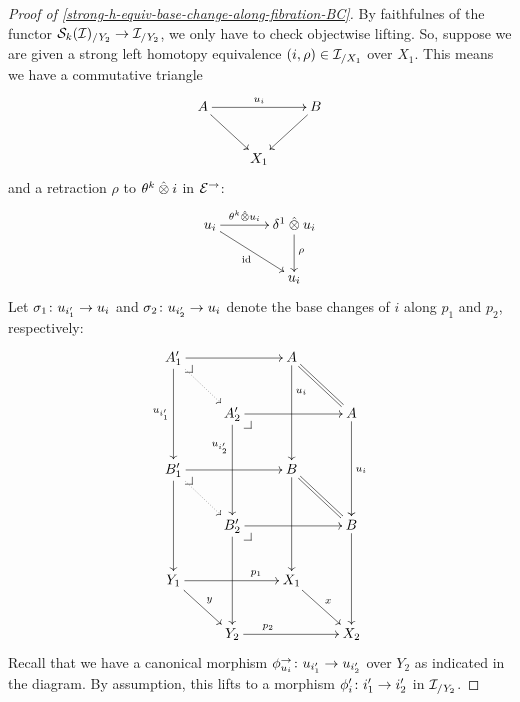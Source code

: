 \documentclass[reqno,10pt,a4paper,oneside,draft]{amsart}
\begin{document}
\begin{theorem}
\begin{proof}[Proof of \cref{strong-h-equiv-base-change-along-fibration-BC}]
By faithfulnes of the functor $\cal{S}_k(\cal{I})_{/Y_2} \to \cal{I}_{/Y_2}$, we only have to check objectwise lifting.
So, suppose we are given a strong left homotopy equivalence $(i, \rho) \in \cal{I}_{/X_1}$ over $X_1$.
This means we have a commutative triangle
\[
\xymatrix{
  A
  \ar[rr]^{u_i}
  \ar[dr]
&&
  B
  \ar[dl]
\\&
  X_1
}
\]
and a retraction $\rho$ to $\thetak \hatotimes i$ in $\catE^\to$:
\[
\xymatrix@C+1em{
  u_i
  \ar[r]^-{\thetak \hatotimes u_i}
  \ar[dr]_{\id}
&
  \rcyl \hatotimes u_i \ar[d]^{\rho}
\\&
  u_i
}
\]
Let $\sigma_1 \co u_{i_1'} \to u_i$ and $\sigma_2 \co u_{i_2'} \to u_i$ denote the base changes of $i$ along $p_1$ and $p_2$, respectively:
\[
\xymatrix{
  A_1'
  \ar[rr]
  \ar[dd]_{u_{i_1'}}
  \pullback{dr}
  \ar@{.>}[dr]
&&
  A
  \ar[dd]^(0.3){u_i}
  \ar@{=}[dr]
\\&
  A_2'
  \ar[rr]
  \ar[dd]_(0.3){u_{i_2'}}
  \pullback{dr}
&&
  A
  \ar[dd]^{u_i}
\\
  B_1'
  \ar[rr]
  \ar[dd]
  \pullback{dr}
  \ar@{.>}[dr]
&&
  B
  \ar[dd]
  \ar@{=}[dr]
\\&
  B_2'
  \ar[rr]
  \ar[dd]
  \pullback{dr}
&&
  B
  \ar[dd]
\\
  Y_1
  \ar[rr]^(0.7){p_1}
  \ar[dr]^{y}
&&
  X_1
  \ar[dr]^{x}
\\&
  Y_2
  \ar[rr]^(0.3){p_2}
&&
  X_2
}
\]
Recall that we have a canonical morphism $\phi_{u_i}^\to \co u_{i_1'} \to u_{i_2'}$ over $Y_2$ as indicated in the diagram.
By assumption, this lifts to a morphism $\phi_i' \co i_1' \to i_2'$ in $\cal{I}_{/Y_2}$.


\end{proof}
\end{theorem}
\end{document}
